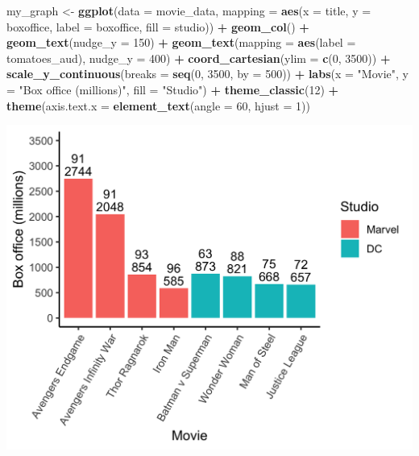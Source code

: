 \documentclass[
]{krantz}
\makeatletter
\newenvironment{Shaded}{\begin{snugshade}}{\end{snugshade}}
\newcommand{\DataTypeTok}[1]{\textcolor[rgb]{0.27,0.27,0.27}{#1}}
\newcommand{\DecValTok}[1]{\textcolor[rgb]{0.06,0.06,0.06}{#1}}
\newcommand{\KeywordTok}[1]{\textcolor[rgb]{0.27,0.27,0.27}{\textbf{#1}}}
\newcommand{\NormalTok}[1]{#1}
\newcommand{\OperatorTok}[1]{\textcolor[rgb]{0.43,0.43,0.43}{\textbf{#1}}}
\newcommand{\StringTok}[1]{\textcolor[rgb]{0.5,0.5,0.5}{#1}}
\newenvironment{kframe}{%
\medskip{}
\setlength{\fboxsep}{.8em}
 \def\at@end@of@kframe{}%
 \ifinner\ifhmode%
  \def\at@end@of@kframe{\end{minipage}}%
  \begin{minipage}{\columnwidth}%
 \fi\fi%
 \def\FrameCommand##1{\hskip\@totalleftmargin \hskip-\fboxsep
 \colorbox{shadecolor}{##1}\hskip-\fboxsep
     \hskip-\linewidth \hskip-\@totalleftmargin \hskip\columnwidth}%
 \MakeFramed {\advance\hsize-\width
   \@totalleftmargin\z@ \linewidth\hsize
   \@setminipage}}%
 {\par\unskip\endMakeFramed%
 \at@end@of@kframe}
\renewenvironment{Shaded}{\begin{kframe}}{\end{kframe}}
\makeatother
\begin{document}
\begin{Shaded}
\begin{Highlighting}[]
\NormalTok{my_graph <-}\StringTok{ }\KeywordTok{ggplot}\NormalTok{(}\DataTypeTok{data =}\NormalTok{ movie_data,}
           \DataTypeTok{mapping =} \KeywordTok{aes}\NormalTok{(}\DataTypeTok{x =}\NormalTok{ title,}
                         \DataTypeTok{y =}\NormalTok{ boxoffice,}
                         \DataTypeTok{label =}\NormalTok{ boxoffice, }
                         \DataTypeTok{fill =}\NormalTok{ studio)) }\OperatorTok{+}
\StringTok{  }\KeywordTok{geom_col}\NormalTok{() }\OperatorTok{+}
\StringTok{  }\KeywordTok{geom_text}\NormalTok{(}\DataTypeTok{nudge_y =} \DecValTok{150}\NormalTok{)  }\OperatorTok{+}
\StringTok{  }\KeywordTok{geom_text}\NormalTok{(}\DataTypeTok{mapping =} \KeywordTok{aes}\NormalTok{(}\DataTypeTok{label =}\NormalTok{ tomatoes_aud), }
            \DataTypeTok{nudge_y =} \DecValTok{400}\NormalTok{) }\OperatorTok{+}
\StringTok{  }\KeywordTok{coord_cartesian}\NormalTok{(}\DataTypeTok{ylim =} \KeywordTok{c}\NormalTok{(}\DecValTok{0}\NormalTok{, }\DecValTok{3500}\NormalTok{)) }\OperatorTok{+}
\StringTok{  }\KeywordTok{scale_y_continuous}\NormalTok{(}\DataTypeTok{breaks =} \KeywordTok{seq}\NormalTok{(}\DecValTok{0}\NormalTok{, }\DecValTok{3500}\NormalTok{, }\DataTypeTok{by =} \DecValTok{500}\NormalTok{)) }\OperatorTok{+}
\StringTok{  }\KeywordTok{labs}\NormalTok{(}\DataTypeTok{x =} \StringTok{"Movie"}\NormalTok{,}
       \DataTypeTok{y =} \StringTok{"Box office (millions)"}\NormalTok{,}
       \DataTypeTok{fill =} \StringTok{"Studio"}\NormalTok{) }\OperatorTok{+}
\StringTok{  }\KeywordTok{theme_classic}\NormalTok{(}\DecValTok{12}\NormalTok{) }\OperatorTok{+}
\StringTok{  }\KeywordTok{theme}\NormalTok{(}\DataTypeTok{axis.text.x =} \KeywordTok{element_text}\NormalTok{(}\DataTypeTok{angle =} \DecValTok{60}\NormalTok{, }
                                   \DataTypeTok{hjust =} \DecValTok{1}\NormalTok{))  }
\end{Highlighting}
\end{Shaded}

\includegraphics[width=0.65\linewidth]{ch_graphing/images/custom_order}
\end{document}
